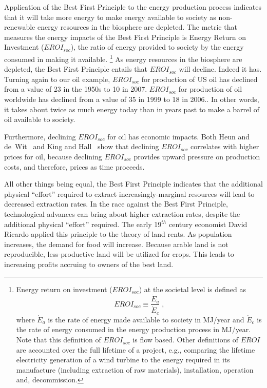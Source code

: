 Application of the Best First Principle to the energy production process 
indicates that it will take more energy 
to make energy available to society as non-renewable 
energy resources in the biosphere are depleted.
The metric that measures the energy impacts of the Best First Principle is 
Energy Return on Investment ($EROI_{soc}$), 
the ratio of energy provided to society 
by the energy consumed in making it available.%
	\footnote{
	Energy return on investment ($EROI_{soc}$) at the societal level is defined as 
	\begin{equation}
		EROI_{soc} \equiv \frac{\dot{E}_a}{\dot{E}_c} \; ,
	\end{equation}
	where $\dot{E}_a$ is the rate of energy made available to society in MJ/year
	and $\dot{E}_c$ is the rate of energy consumed in the energy production process in MJ/year.
	Note that this definition of $EROI_{soc}$ is flow based.
	Other definitions of $EROI$ are accounted over the full lifetime of a project,
	e.g., comparing the lifetime electricity generation of a wind turbine
	to the energy required in its 
	manufacture (including extraction of raw materials),
	installation,
	operation and,
	decommission.
	}
As energy resources in the biosphere are depleted, 
the Best First Principle entails that
$EROI_{soc}$ will decline.
Indeed it has.
Turning again to our oil example, $EROI_{soc}$ for production of US oil has declined 
from a value of 23 in the 1950s
to 10 in 2007.\cite[Fig.~2]{Guilford:2011ci}
$EROI_{soc}$ for production of oil worldwide has declined 
from a value of 35 in 1999
to 18 in 2006.\cite[Fig.~1]{Gagnon:2009fc}.
In other words, it takes about twice as much energy today
than in years past
to make a barrel of oil available to society.

Furthermore, declining $EROI_{soc}$ for oil has economic impacts.
Both Heun and de~Wit~\cite{Heun:2012ek} and King and Hall~\cite{King:2011go}
show that declining $EROI_{soc}$ correlates with higher prices for oil, 
because declining $EROI_{soc}$ provides upward pressure on 
production costs, and therefore, prices
as time proceeds.

All other things being equal, the Best First Principle
indicates that the additional physical ``effort'' required to extract
increasingly-marginal resources will lead to decreased extraction rates.
In the race against the Best First Principle,
technological advances can bring about higher extraction rates, 
despite the additional physical ``effort'' required. 
The early 19$^{th}$ century economist David Ricardo applied this 
principle to the theory of land rents. 
As population increases, 
the demand for food will increase. 
Because arable land is not reproducible, 
less-productive land will be utilized for crops. 
This leads to increasing profits accruing to owners of the best land.

